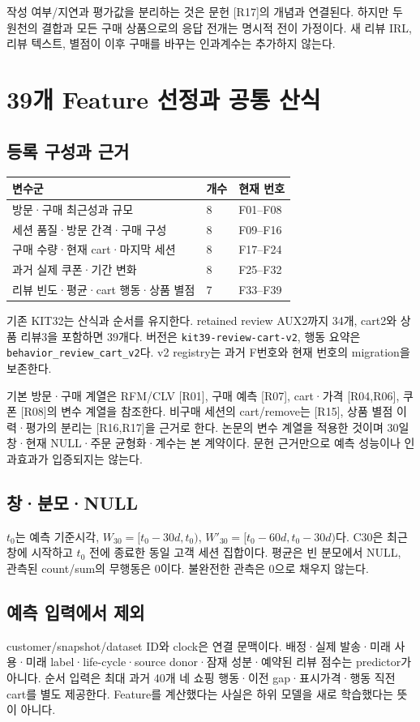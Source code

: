 \documentclass[11pt,a4paper]{article}
\newcommand{\code}[1]{{\ttfamily\footnotesize\nolinkurl{#1}}}
\newcommand{\page}{\clearpage}
\newcommand{\thead}{\rowcolor{pale}}
\begin{document}
작성 여부/지연과 평가값을 분리하는 것은 문헌 [R17]의 개념과 연결된다. 하지만 두 원천의 결합과 모든 구매 상품으로의 응답 전개는 명시적 전이 가정이다. 새 리뷰 IRL, 리뷰 텍스트, 별점이 이후 구매를 바꾸는 인과계수는 추가하지 않는다.

\page
\section{39개 Feature 선정과 공통 산식}
\subsection{등록 구성과 근거}
\begin{tabularx}{\linewidth}{@{}P{.45\linewidth}P{.12\linewidth}Y@{}}\thead 변수군 & 개수 & 현재 번호\\\midrule
방문·구매 최근성과 규모 & 8 & F01--F08\\
세션 품질·방문 간격·구매 구성 & 8 & F09--F16\\
구매 수량·현재 cart·마지막 세션 & 8 & F17--F24\\
과거 실제 쿠폰·기간 변화 & 8 & F25--F32\\
리뷰 빈도·평균·cart 행동·상품 별점 & 7 & F33--F39\\\bottomrule\end{tabularx}

기존 KIT32는 산식과 순서를 유지한다. retained review AUX2까지 34개, cart2와 상품 리뷰3을 포함하면 39개다. 버전은 \code{kit39-review-cart-v2}, 행동 요약은 \code{behavior_review_cart_v2}다. v2 registry는 과거 F번호와 현재 번호의 migration을 보존한다.

기본 방문·구매 계열은 RFM/CLV [R01], 구매 예측 [R07], cart·가격 [R04,R06], 쿠폰 [R08]의 변수 계열을 참조한다. 비구매 세션의 cart/remove는 [R15], 상품 별점 이력·평가의 분리는 [R16,R17]을 근거로 한다. 논문의 변수 계열을 적용한 것이며 30일 창·현재 NULL·주문 균형화·계수는 본 계약이다. 문헌 근거만으로 예측 성능이나 인과효과가 입증되지는 않는다.

\subsection{창·분모·NULL}
$t_0$는 예측 기준시각, $W_{30}=[t_0-30d,t_0)$, $W'_{30}=[t_0-60d,t_0-30d)$다. C30은 최근 창에 시작하고 $t_0$ 전에 종료한 동일 고객 세션 집합이다. 평균은 빈 분모에서 NULL, 관측된 count/sum의 무행동은 0이다. 불완전한 관측은 0으로 채우지 않는다.

\subsection{예측 입력에서 제외}
customer/snapshot/dataset ID와 clock은 연결 문맥이다. 배정·실제 발송·미래 사용·미래 label·life-cycle·source donor·잠재 성분·예약된 리뷰 점수는 predictor가 아니다. 순서 입력은 최대 과거 40개 네 쇼핑 행동·이전 gap·표시가격·행동 직전 cart를 별도 제공한다. Feature를 계산했다는 사실은 하위 모델을 새로 학습했다는 뜻이 아니다.
\end{document}
